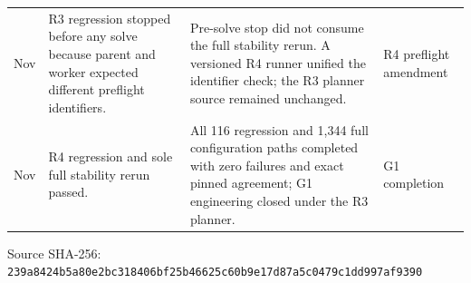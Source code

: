 \documentclass[preprint,11pt,authoryear]{elsarticle}
\newif\ifprovenance\provenancetrue
\begin{document}
\begin{longtable}{>{\raggedright\arraybackslash}p{1.1cm}>{\raggedright\arraybackslash}p{4.6cm}>{\raggedright\arraybackslash}p{6.2cm}>{\raggedright\arraybackslash}p{2.7cm}}
13 Nov & R3 regression stopped before any solve because parent and worker expected different preflight identifiers. & Pre-solve stop did not consume the full stability rerun. A versioned R4 runner unified the identifier check; the R3 planner source remained unchanged. & R4 preflight amendment \\
13 Nov & R4 regression and sole full stability rerun passed. & All 116 regression and 1,344 full configuration paths completed with zero failures and exact pinned agreement; G1 engineering closed under the R3 planner. & G1 completion \\
\end{longtable}
\ifprovenance\noindent\scriptsize Source SHA-256: \texttt{239a8424b5a80e2bc318406bf25b46625c60b9e17d87a5c0479c1dd997af9390}\par\fi
\endgroup
\end{document}
